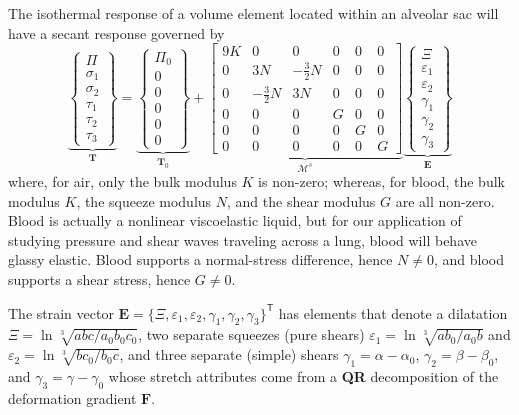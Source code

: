 The isothermal response of a volume element located within an alveolar sac will have a secant response governed by
\begin{equation}
    \underbrace{\left\{ \begin{matrix}
        \Pi \\ \sigma_1 \\ \sigma_2 \\ \tau_1 \\ \tau_2 \\ \tau_3
    \end{matrix} \right\}}_{\boldsymbol{T}} = 
    \underbrace{\left\{ \begin{matrix} 
        \Pi_0 \\ 0 \\ 0 \\ 0 \\ 0 \\ 0
    \end{matrix} \right\}}_{\boldsymbol{T}_0} +
    \underbrace{\begin{bmatrix}
        9K & 0 & 0 & 0 & 0 & 0 \\
        0 & 3N & -\frac{3}{2} N & 0 & 0 & 0 \\
        0 & -\frac{3}{2} N & 3N & 0 & 0 & 0 \\
        0 & 0 & 0 & G & 0 & 0 \\
        0 & 0 & 0 & 0 & G & 0 \\
        0 & 0 & 0 & 0 & 0 & G
    \end{bmatrix}}_{\boldsymbol{\mathcal{M}}^s} 
    \underbrace{\left\{ \begin{matrix} 
        \Xi \\ \varepsilon_1 \\ \varepsilon_2 \\ \gamma_1 \\ \gamma_2 \\ \gamma_3
    \end{matrix} \right\}}_{\boldsymbol{E}}
\end{equation}
where, for air, only the bulk modulus $K$ is non-zero; whereas, for blood, the bulk modulus $K$, the squeeze modulus $N$, and the shear modulus $G$ are all non-zero.  Blood is actually a nonlinear visco\-elastic liquid, but for our application of studying pressure and shear waves traveling across a lung, blood will behave glassy elastic.  Blood supports a normal-stress difference, hence $N \neq 0$, and blood supports a shear stress, hence $G \neq 0$.

The strain vector $\boldsymbol{E} = \{ \Xi, \varepsilon_1, \varepsilon_2, \gamma_1, \gamma_2, \gamma_3 \}^{\mathsf{T}}$ has elements that denote a dilatation $\Xi = \ln \sqrt[3]{abc/a_0b_0c_0}$, two separate squeezes (pure shears) $\varepsilon_1 = \ln \sqrt[3]{ab_0/a_0b}$ and $\varepsilon_2 = \ln \sqrt[3]{bc_0/b_0c}$, and three separate (simple) shears $\gamma_1 = \alpha - \alpha_0$, $\gamma_2 = \beta - \beta_0$, and $\gamma_3 = \gamma - \gamma_0$ whose stretch attributes come from a \textbf{QR} decomposition of the deformation gradient $\mathbf{F}$.


